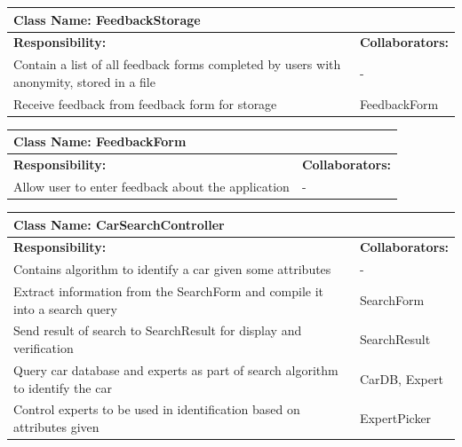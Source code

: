\documentclass[12pt]{article}
\begin{document}
	\begin{table}[ht]
		\centering
		\begin{tabular}{|p{5cm}|p{5cm}|}
		\hline
		 \multicolumn{2}{|l|}{\textbf{Class Name:} FeedbackStorage} \\
		\hline
		\textbf{Responsibility:} & \textbf{Collaborators:} \\
		\hline
		Contain a list of all feedback forms completed by users with anonymity, stored in a file & -\\
		\hline
	    Receive feedback from feedback form for storage & FeedbackForm\\
		\hline
		\end{tabular}
	\end{table}

	\begin{table}[ht]
		\centering
		\begin{tabular}{|p{5cm}|p{5cm}|}
		\hline
		 \multicolumn{2}{|l|}{\textbf{Class Name:} FeedbackForm} \\
		\hline
		\textbf{Responsibility:} & \textbf{Collaborators:} \\
		\hline
	    Allow user to enter feedback about the application & -\\
		\hline
		\end{tabular}
	\end{table}

	\begin{table}[ht]
		\centering
		\begin{tabular}{|p{5cm}|p{5cm}|}
		\hline
		 \multicolumn{2}{|l|}{\textbf{Class Name:} CarSearchController} \\
		\hline
		\textbf{Responsibility:} & \textbf{Collaborators:} \\
		\hline
		Contains algorithm to identify a car given some attributes & -\\
		\hline
	    Extract information from the SearchForm and compile it into a search query & SearchForm\\
	    \hline
	    Send result of search to SearchResult for display and verification & SearchResult\\
	    \hline
	    Query car database and experts as part of search algorithm to identify the car & CarDB, Expert\\
	    \hline
	    Control experts to be used in identification based on attributes given & ExpertPicker\\
		\hline
		\end{tabular}
	\end{table}
\end{document}
